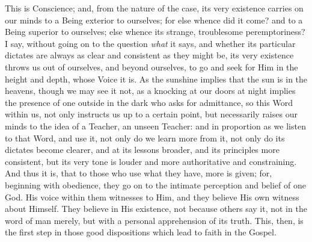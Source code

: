 This is Conscience; and, from the nature of the case,
its very existence carries on our minds to a Being
exterior to ourselves; for else whence did it come? and
to a Being superior to ourselves; else whence its
strange, troublesome peremptoriness? I say, without going
on to the question \emph{what} it says, and whether its
particular dictates are always as clear and consistent as
they might be, its very existence throws us out of
ourselves, and beyond ourselves, to go and seek for Him
in the height and depth, whose Voice it is. As the
sunshine implies that the sun is in the heavens, though
we may see it not, as a knocking at our doors at night
implies the presence of one outside in the dark who asks
for admittance, so this Word within us, not only
instructs us up to a certain point, but necessarily
raises our minds to the idea of a Teacher, an unseen
Teacher: and in proportion as we listen to that Word, and
use it, not only do we learn more from it, not only do
its dictates become clearer, and at its lessons broader,
and its principles more consistent, but its very tone is
louder and more authoritative and constraining. And thus
it is, that to those who use what they have, more is
given; for, beginning with obedience, they go on to the
intimate perception and belief of one God. His voice
within them witnesses to Him, and they believe His own
witness about Himself. They believe in His existence, not
because others say it, not in the word of man merely, but
with a personal apprehension of its truth. This, then, is
the first step in those good dispositions which lead to
faith in the Gospel.

